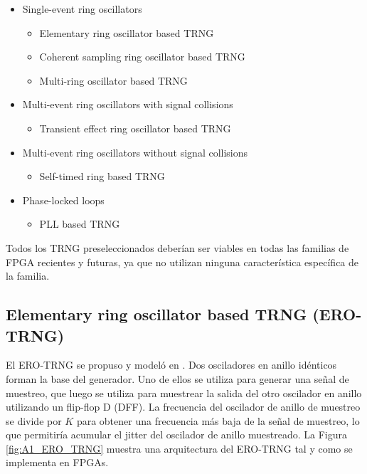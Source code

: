         \begin{itemize}
            \item Single-event ring oscillators
                \begin{itemize}
                    \item Elementary ring oscillator based TRNG 
                    \item Coherent sampling ring oscillator based TRNG 
                    \item Multi-ring oscillator based TRNG 
                \end{itemize}
            \item Multi-event ring oscillators with signal collisions
                \begin{itemize}
                    \item Transient effect ring oscillator based TRNG 
                \end{itemize}
            \item Multi-event ring oscillators without signal collisions
                \begin{itemize}
                    \item Self-timed ring based TRNG 
                \end{itemize}
            \item Phase-locked loops
                \begin{itemize}
                    \item PLL based TRNG 
                \end{itemize}
        \end{itemize}

        Todos los TRNG preseleccionados deberían ser viables en todas las familias de FPGA recientes y futuras, ya que no utilizan ninguna característica específica de la familia.

            	
		\subsection{Elementary ring oscillator based TRNG (ERO-TRNG)}
		
                El ERO-TRNG se propuso y modeló en \cite{Baudet2010}. Dos osciladores en anillo idénticos forman la base del generador. Uno de ellos se utiliza para generar una señal de muestreo, que luego se utiliza para muestrear la salida del otro oscilador en anillo utilizando un flip-flop D (DFF). La frecuencia del oscilador de anillo de muestreo se divide por $K$ para obtener una frecuencia más baja de la señal de muestreo, lo que permitiría acumular el jitter del oscilador de anillo muestreado. La Figura \ref{fig:A1_ERO_TRNG} muestra una arquitectura del ERO-TRNG tal y como se implementa en FPGAs.
					
